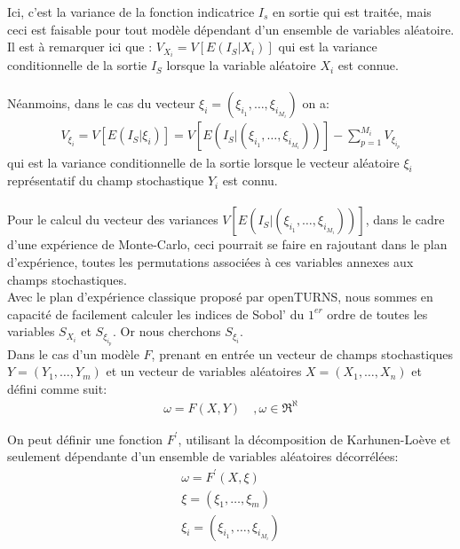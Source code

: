 \documentclass[a4paper,10pt]{article}
\begin{document}
Ici, c'est la variance de la fonction indicatrice $I_{s}$ en sortie qui est traitée, mais ceci est faisable pour tout modèle dépendant d'un ensemble de variables aléatoire. Il est à remarquer ici que : 
$V_{X_{i}} = V\left[E\left(I_{S}|X_{i}\right)\right]$ qui est la variance conditionnelle de la sortie $I_{S}$ lorsque la variable aléatoire $X_{i}$ est connue. \\ 
\\
Néanmoins, dans le cas du vecteur $\xi_{i} = (\xi_{i_{1}},\ldots,\xi_{i_{M_{i}}})$ on a: \\
\begin{eqnarray}
V_{\xi_{i}} = V\left[E\left(I_{S}|\xi_{i}\right)\right] = V\left[E\left(I_{S}|(\xi_{i_{1}},\ldots,\xi_{i_{M_{i}}})\right)\right] - \sum_{p=1}^{M_{i}}V_{\xi_{i_{p}}}
\end{eqnarray}
qui est la variance conditionnelle de la sortie lorsque le vecteur aléatoire $\xi_{i}$ représentatif du champ stochastique $Y_{i}$ est connu.\\
\\  
Pour le calcul du vecteur des variances $V\left[E\left(I_{S}|(\xi_{i_{1}},\ldots,\xi_{i_{M_{i}}})\right)\right]$, dans le cadre d'une expérience de Monte-Carlo, ceci pourrait se faire en rajoutant dans le plan d’expérience, toutes les permutations associées à ces variables annexes aux champs stochastiques. \\

Avec le plan d’expérience classique proposé par openTURNS, nous sommes en capacité de facilement calculer les indices de Sobol' du $1^{er}$ ordre de toutes les variables $S_{X_{i}}$ et $S_{\xi_{i_{p}}}$. Or nous cherchons $S_{\xi_{i}}$.\\
Dans le cas d'un modèle $F$, prenant en entrée un vecteur de champs stochastiques $Y = (Y_{1},\ldots,Y_{m})$ et un vecteur de variables aléatoires $X = (X_{1},\ldots,X_{n})$ et défini comme suit:  
\begin{align}
\omega = F(X,Y) &\  ,\omega \in \Re^{\aleph}
\end{align}


On peut définir une fonction $F^{'}$, utilisant la décomposition de Karhunen-Loève et seulement dépendante d'un ensemble de variables aléatoires décorrélées: 
\begin{align}
\omega = F^{'}(X,\xi) \\
\xi = (\xi_{1},\ldots,\xi_{m})\\
\xi_{i} = (\xi_{i_{1}},\ldots,\xi_{i_{M_{i}}})
\end{align} \\
\end{document}
